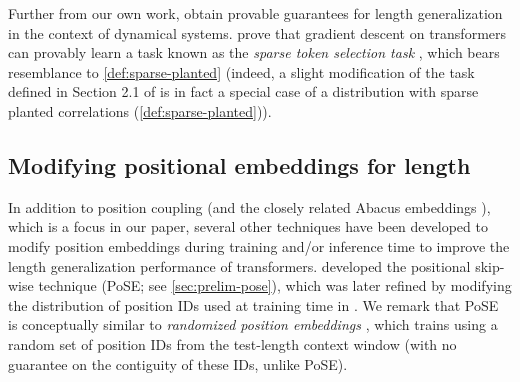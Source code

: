Further from our own work, \citet{marsden_provable_2024} obtain provable guarantees for length generalization in the context of dynamical systems. \citet{wang_transformers_2024} prove that gradient descent on transformers can provably learn a task known as the \emph{sparse token selection task} \cite{sanford_representational_2023}, which bears resemblance to \cref{def:sparse-planted} (indeed, a slight modification of the task defined in Section 2.1 of \citet{wang_transformers_2024} is in fact a special case of a distribution with sparse planted correlations (\cref{def:sparse-planted})). 




\subsection{Modifying positional embeddings for length \generalization}
\label{sec:related-posids}
In addition to position coupling \cite{cho_position_2024,cho_arithmetic_2024} (and the closely related Abacus embeddings  \cite{mcleish_transformers_2024}), which is a focus in our paper, several other techniques have been developed to modify position embeddings during training and/or inference time to improve the length generalization performance of transformers. \citet{zhu_pose_2024} developed the positional skip-wise technique (PoSE; see \cref{sec:prelim-pose}), which was later refined by modifying the distribution of position IDs used at training time in \citet{wu_never_2024}. We remark that PoSE is conceptually similar to \emph{randomized position embeddings} \cite{ruoss_randomized_2023}, which trains using a random set of position IDs from the test-length context window (with no guarantee on the contiguity of these IDs, unlike PoSE).

